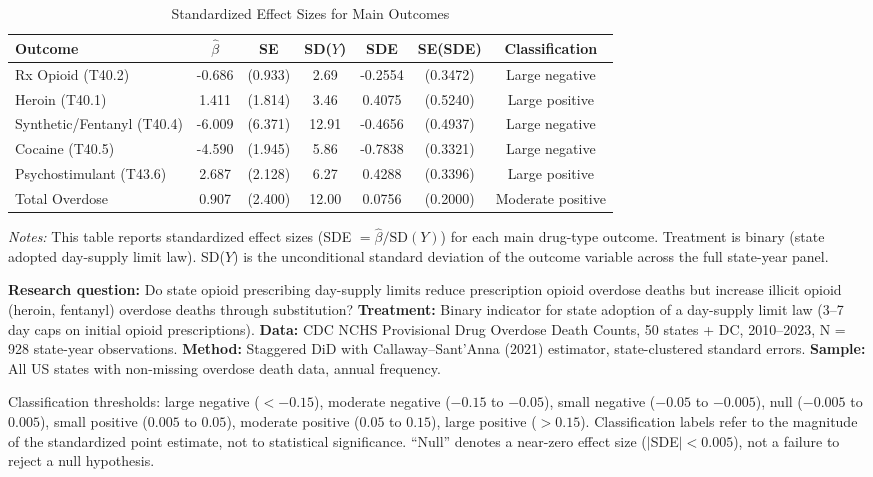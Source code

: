 \begin{table}[H]
\centering
\caption{Standardized Effect Sizes for Main Outcomes}
\label{tab:sde}
\begin{adjustbox}{max width=\textwidth}
\begin{tabular}{lcccccc}
\toprule
Outcome & $\hat{\beta}$ & SE & SD($Y$) & SDE & SE(SDE) & Classification \\
\midrule
Rx Opioid (T40.2) & -0.686 & (0.933) & 2.69 & -0.2554 & (0.3472) & Large negative \\
Heroin (T40.1) & 1.411 & (1.814) & 3.46 & 0.4075 & (0.5240) & Large positive \\
Synthetic/Fentanyl (T40.4) & -6.009 & (6.371) & 12.91 & -0.4656 & (0.4937) & Large negative \\
Cocaine (T40.5) & -4.590 & (1.945) & 5.86 & -0.7838 & (0.3321) & Large negative \\
Psychostimulant (T43.6) & 2.687 & (2.128) & 6.27 & 0.4288 & (0.3396) & Large positive \\
Total Overdose & 0.907 & (2.400) & 12.00 & 0.0756 & (0.2000) & Moderate positive \\
\bottomrule
\end{tabular}
\end{adjustbox}
\par\vspace{0.3em}
{\footnotesize \emph{Notes:} This table reports standardized effect sizes (SDE $= \hat{\beta} / \text{SD}(Y)$) for each main drug-type outcome.
Treatment is binary (state adopted day-supply limit law).
SD($Y$) is the unconditional standard deviation of the outcome variable across the full state-year panel.

\textbf{Research question:} Do state opioid prescribing day-supply limits reduce prescription opioid overdose deaths but increase illicit opioid (heroin, fentanyl) overdose deaths through substitution?
\textbf{Treatment:} Binary indicator for state adoption of a day-supply limit law (3--7 day caps on initial opioid prescriptions).
\textbf{Data:} CDC NCHS Provisional Drug Overdose Death Counts, 50 states + DC, 2010--2023, N = 928 state-year observations.
\textbf{Method:} Staggered DiD with Callaway--Sant'Anna (2021) estimator, state-clustered standard errors.
\textbf{Sample:} All US states with non-missing overdose death data, annual frequency.

Classification thresholds: large negative ($< -0.15$), moderate negative ($-0.15$ to $-0.05$),
small negative ($-0.05$ to $-0.005$), null ($-0.005$ to $0.005$),
small positive ($0.005$ to $0.05$), moderate positive ($0.05$ to $0.15$),
large positive ($> 0.15$).
Classification labels refer to the magnitude of the standardized point estimate,
not to statistical significance. ``Null'' denotes a near-zero effect size ($|$SDE$| < 0.005$),
not a failure to reject a null hypothesis.}
\end{table}
